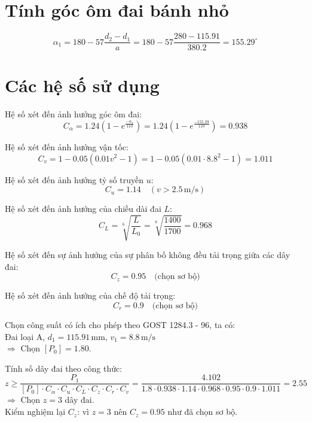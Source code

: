 \section{Tính góc ôm đai bánh nhỏ}
\begin{equation}
    \alpha_1 = 180 - 57 \frac{d_2 - d_1}{a} = 180 - 57 \frac{280 - 115.91}{380.2} = 155.29^{\circ}
\end{equation}
\section{Các hệ số sử dụng}
Hệ số xét đến ảnh hưởng góc ôm đai:
\begin{equation}
    C_{\alpha} = 1.24(1 - e^{\frac{-\alpha_1}{110}}) = 1.24(1 - e^{\frac{-155.29}{110}}) = 0.938
\end{equation}

Hệ số xét đến ảnh hưởng vận tốc:
\begin{equation}
    C_v = 1 - 0.05(0.01v^2 - 1) = 1 - 0.05(0.01 \cdot 8.8^2 - 1) = 1.011
\end{equation}

Hệ số xét đến ảnh hưởng tỷ số truyền $u$:
\begin{equation}
    C_u = 1.14 \quad (v > 2.5 \, \text{m/s})
\end{equation}

Hệ số xét đến ảnh hưởng của chiều dài đai $L$:
\begin{equation}
    C_L = \sqrt[6]{\frac{L}{L_0}} = \sqrt[6]{\frac{1400}{1700}} = 0.968
\end{equation}

Hệ số xét đến sự ảnh hưởng của sự phân bố không đều tải trọng giữa các dây đai:
\begin{equation}
    C_z = 0.95 \quad \text{(chọn sơ bộ)}
\end{equation}

Hệ số xét đến ảnh hưởng của chế độ tải trọng:
\begin{equation}
    C_r = 0.9 \quad \text{(chọn sơ bộ)}
\end{equation}

Chọn công suất có ích cho phép theo GOST 1284.3 - 96, ta có: \\
Đai loại A, $d_1 = 115.91 \, \text{mm}$, $v_1 = 8.8 \, \text{m/s}$ \\
$\Rightarrow$ Chọn $[P_0] = 1.80$.

Tính số dây đai theo công thức:
\begin{equation}
    z \geq \frac{P_1}{[P_0] \cdot C_{\alpha} \cdot C_u \cdot C_L \cdot C_z \cdot C_r \cdot C_v} = \frac{4.102}{1.8 \cdot 0.938 \cdot 1.14 \cdot 0.968 \cdot 0.95 \cdot 0.9 \cdot 1.011} = 2.55
\end{equation}
$\Rightarrow$ Chọn $z = 3$ dây đai. \\
Kiểm nghiệm lại $C_z$: vì $z = 3$ nên $C_z = 0.95$ như đã chọn sơ bộ.


